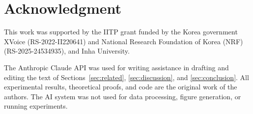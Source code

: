 \documentclass[conference]{IEEEtran}
\begin{document}
\section*{Acknowledgment}


This work was supported by the IITP grant funded by the Korea government XVoice (RS-2022-II220641) and National Research Foundation of Korea (NRF) (RS-2025-24534935), and
Inha University.

The Anthropic Claude API was used for writing assistance in drafting and editing the text of Sections~\ref{sec:related}, \ref{sec:discussion}, and \ref{sec:conclusion}. All experimental results, theoretical proofs, and code are the original work of the authors. The AI system was not used for data processing, figure generation, or running experiments.



\end{document}
